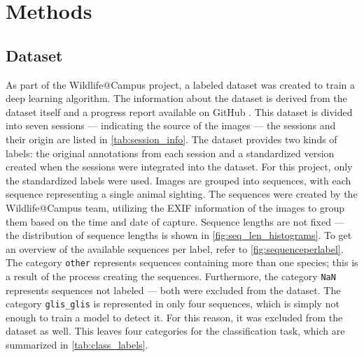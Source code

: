 

\section{Methods}
\label{methods}

    \subsection{Dataset}
    As part of the Wildlife@Campus project, a labeled dataset was created to train a deep learning algorithm.
    The information about the dataset is derived from the dataset itself and a progress report available on GitHub \autocite{ratnaweeraWildlifeCampusProgressReports2021}.
    This dataset is divided into seven sessions --- indicating the source of the images --- the sessions and their origin are listed in \autoref{tab:session_info}.
    The dataset provides two kinds of labels: the original annotations from each session and a standardized version created when the sessions were integrated into the dataset.
    For this project, only the standardized labels were used.
    Images are grouped into sequences, with each sequence representing a single animal sighting.
    The sequences were created by the Wildlife@Campus team, utilizing the \ac{EXIF} information of the images to group them based on the time and date of capture.
    Sequence lengths are not fixed --- the distribution of sequence lengths is shown in \autoref{fig:seq_len_histograms}.
    To get an overview of the available sequences per label, refer to \autoref{fig:sequenceperlabel}.
    The category \texttt{other} represents sequences containing more than one species; this is a result of the process creating the sequences.
    Furthermore, the category \texttt{NaN} represents sequences not labeled --- both were excluded from the dataset.
    The category \texttt{glis\_glis} is represented in only four sequences, which is simply not enough to train a model to detect it.
    For this reason, it was excluded from the dataset as well.
    This leaves four categories for the classification task, which are summarized in \autoref{tab:class_labels}.

    

